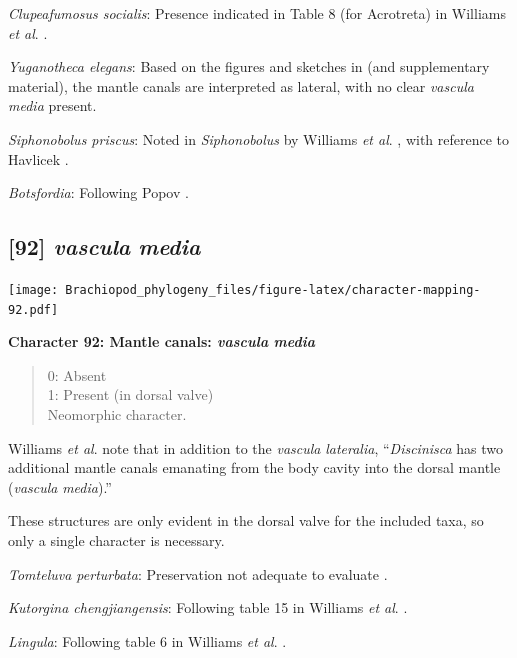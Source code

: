 \documentclass[]{book}
\theoremstyle{definition}
\theoremstyle{definition}
\theoremstyle{definition}
\theoremstyle{remark}
\begin{document}
\emph{Clupeafumosus socialis}: Presence indicated in Table 8 (for
Acrotreta) in Williams \emph{et al}.
\citeyearpar{Williams2000BrachiopodaLinguliformea}.

\emph{Yuganotheca elegans}: Based on the figures and sketches in
\citet{Zhang2014Anearly} (and supplementary material), the mantle canals
are interpreted as lateral, with no clear \emph{vascula} \emph{media}
present.

\emph{Siphonobolus priscus}: Noted in \emph{Siphonobolus} by Williams
\emph{et al}. \citeyearpar{Williams2000BrachiopodaLinguliformea}, with
reference to Havlicek \citeyearpar{Havlicek1982LingulaceaPaterinacea}.

\emph{Botsfordia}: Following Popov \citeyearpar{Popov1992TheCambrian}.

\hypertarget{vascula-media}{%
\subsection*{\texorpdfstring{{[}92{]} \emph{vascula}
\emph{media}}{{[}92{]} vascula media}}\label{vascula-media}}

\texttt{[image: Brachiopod\_phylogeny\_files/figure-latex/character-mapping-92.pdf]}

\textbf{Character 92: Mantle canals: \emph{vascula} \emph{media}}

\begin{quote}
0: Absent\\
1: Present (in dorsal valve)\\
Neomorphic character.
\end{quote}

Williams \emph{et al}. \citeyearpar{Williams1997BrachiopodaRevised} note
that in addition to the \emph{vascula} \emph{lateralia},
``\emph{Discinisca} has two additional mantle canals emanating from the
body cavity into the dorsal mantle (\emph{vascula} \emph{media}).''

These structures are only evident in the dorsal valve for the included
taxa, so only a single character is necessary.

\emph{Tomteluva perturbata}: Preservation not adequate to evaluate
\citep{Streng2016Anew}.

\emph{Kutorgina chengjiangensis}: Following table 15 in Williams
\emph{et al}. \citeyearpar{Williams2000BrachiopodaLinguliformea}.

\emph{Lingula}: Following table 6 in Williams \emph{et al}.
\citeyearpar{Williams2000BrachiopodaLinguliformea}.
\end{document}
